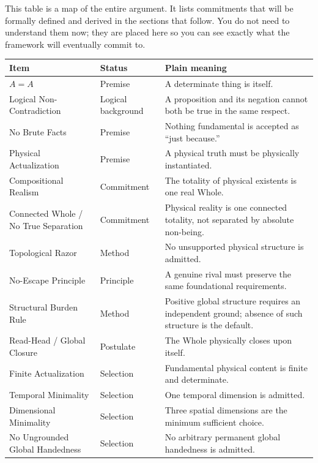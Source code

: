 \documentclass[11pt]{article}
\theoremstyle{canonstyle}
\begin{document}
\begin{howtoread}
This table is a map of the entire argument. It lists commitments that will be formally defined and derived in the sections that follow. You do not need to understand them now; they are placed here so you can see exactly what the framework will eventually commit to.
\end{howtoread}

\begin{center}
\small
\begin{tabularx}{\textwidth}{@{}>{\raggedright\arraybackslash}p{4.8cm} >{\raggedright\arraybackslash}p{3.2cm} X@{}}
\toprule
\textbf{Item} & \textbf{Status} & \textbf{Plain meaning} \\
\midrule
$A = A$ & Premise & A determinate thing is itself. \\
Logical Non-Contradiction & Logical background & A proposition and its negation cannot both be true in the same respect. \\
No Brute Facts & Premise & Nothing fundamental is accepted as ``just because.'' \\
Physical Actualization & Premise & A physical truth must be physically instantiated. \\
Compositional Realism & Commitment & The totality of physical existents is one real Whole. \\
Connected Whole / No True Separation & Commitment & Physical reality is one connected totality, not separated by absolute non-being. \\
Topological Razor & Method & No unsupported physical structure is admitted. \\
No-Escape Principle & Principle & A genuine rival must preserve the same foundational requirements. \\
Structural Burden Rule & Method & Positive global structure requires an independent ground; absence of such structure is the default. \\
Read-Head / Global Closure & Postulate & The Whole physically closes upon itself. \\
Finite Actualization & Selection & Fundamental physical content is finite and determinate. \\
Temporal Minimality & Selection & One temporal dimension is admitted. \\
Dimensional Minimality & Selection & Three spatial dimensions are the minimum sufficient choice. \\
No Ungrounded Global Handedness & Selection & No arbitrary permanent global handedness is admitted. \\

\end{tabularx}
\end{center}
\end{document}
